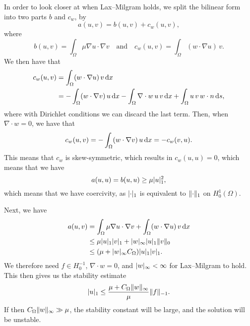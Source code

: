 In order to look closer at when Lax--Milgram holds, we split the bilinear form into two parts $b$ and $c_w$, by %
\begin{equation}
    a(u, v) = b(u, v) + c_w(u, v),
\end{equation}
where
\begin{equation}
    b(u, v) = \int_{\Omega} \mu \nabla u \cdot \nabla v
    \quad\text{and}\quad
    c_w(u, v) = \int_\Omega (w \cdot \nabla u) \, v.
\end{equation}
We then have that
\begin{align*}
    c_w(u, v) &= \int_\Omega (w \cdot \nabla u) \, v \mathop{}\!\mathrm{d} x \\
    &= - \int_\Omega (w \cdot \nabla v)\, u \mathop{}\!\mathrm{d} x - \int_{\Omega} \nabla \cdot w\, u\, v \mathop{}\!\mathrm{d} x + \int_\Omega u\, v\, w \cdot n \mathop{}\!\mathrm{d} s,
\end{align*}
where with Dirichlet conditions we can discard the last term.
Then, when $\nabla \cdot w = 0$, we have that
\begin{equation}
    c_w(u, v) = - \int_\Omega (w \cdot \nabla v)\, u \mathop{}\!\mathrm{d} x = - c_w(v, u).
\end{equation}
This means that $c_w$ is skew-symmetric, which results in $c_w(u, u) = 0$, which means that we have
\begin{equation}
    a(u, u) = b(u, u) \geq \mu \lvert u\rvert_1^2,
\end{equation}
which means that we have coercivity, as $\lvert\cdot\rvert_1$ is equivalent to $\lVert\cdot\rVert_1$ on $H^1_0(\Omega)$.

Next, we have
\begin{align*}
    a(u, v) &= \int_\Omega \mu \nabla u \cdot \nabla v + \int_\Omega (w \cdot \nabla u) \, v \mathop{}\!\mathrm{d} x \\
    &\leq \mu \lvert u\rvert_1 \lvert v\rvert_1 + \lvert w\rvert_\infty \lvert u\rvert_1 \lVert v\rVert_0 \\
    &\leq (\mu + \lvert w\rvert_\infty C_\Omega) \lvert u\rvert_1 \lvert v\rvert_1.
\end{align*}
We therefore need $f \in H^{-1}_0$, $\nabla \cdot w = 0$, and $\lvert w\rvert_\infty < \infty$ for Lax--Milgram to hold. %
This then gives us the stability estimate
\begin{equation}
    \lvert u\rvert_1 \leq \frac{\mu + C_\Omega \lVert w\rVert_\infty}{\mu} \lVert f\rVert_{-1}.
\end{equation}
If then $C_\Omega \lVert w\rVert_\infty \gg \mu$, the stability constant will be large, and the solution will be unstable.

